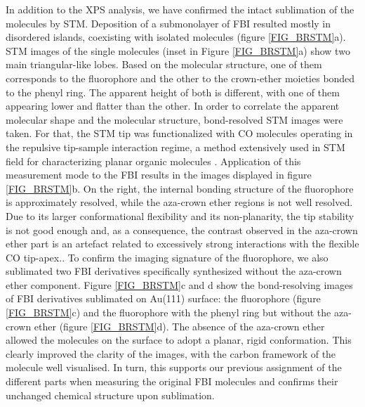 \documentclass[aps,prl,reprint,longbibliography,superscriptaddress, english]{revtex4-1}
\begin{document}
In addition to the XPS analysis, we have confirmed the intact sublimation of the molecules by STM. Deposition of a submonolayer of FBI resulted mostly in disordered islands, coexisting with isolated molecules (figure {\ref{FIG_BRSTM}a}). STM images of the single molecules (inset in Figure  {\ref{FIG_BRSTM}a}) show two main triangular-like lobes. Based on the molecular structure, one of them corresponds to the fluorophore and the other to the crown-ether moieties bonded to the phenyl ring. The apparent height of both is different, with one of them appearing lower and flatter than the other. In order to correlate the apparent molecular shape and the molecular structure, bond-resolved STM images were taken. For that, the STM tip was functionalized with CO molecules operating in the repulsive tip-sample interaction regime, a method extensively used in STM field for characterizing planar organic molecules \cite{gross_recent_2011,gross_atomic_2018}. Application of this measurement mode to the FBI results in the images displayed in figure \ref{FIG_BRSTM}b. On the right, the internal bonding structure of the fluorophore is approximately resolved, while the aza-crown ether regions is not well resolved. Due to its larger conformational flexibility and its non-planarity, the tip stability is not good enough and, as a consequence, the contrast observed in the aza-crown ether part is an artefact related to excessively strong interactions with the flexible CO tip-apex.\cite{moll_mechanisms_2010,hapala_mechanism_2014}. To confirm the imaging signature of the fluorophore, we also sublimated two FBI derivatives specifically synthesized without the aza-crown ether component. Figure \ref{FIG_BRSTM}c and d show the bond-resolving images of FBI derivatives sublimated on Au(111) surface: the fluorophore (figure {\ref{FIG_BRSTM}c}) and the fluorophore with the phenyl ring but without the aza-crown ether (figure {\ref{FIG_BRSTM}d}). The absence of the aza-crown ether allowed the molecules on the surface to adopt a planar, rigid conformation. This clearly improved the clarity of the images, with the carbon framework of the molecule well visualised. In turn, this supports our previous assignment of the different parts when measuring the original FBI molecules and confirms their unchanged chemical structure upon sublimation.  
\end{document}
